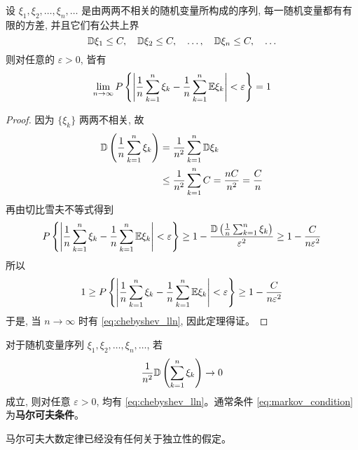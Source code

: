 \begin{proposition}[切比雪夫大数定律]\label{prop:chebyshev_lln}
    设 $\xi_1, \xi_2, \ldots, \xi_n, \ldots$ 是由两两不相关的随机变量所构成的序列, 每一随机变量都有有限的方差, 并且它们有公共上界
\[
\mathbb{D}\xi_1 \le C, \quad \mathbb{D}\xi_2 \le C, \quad \ldots, \quad \mathbb{D}\xi_n \le C, \quad \ldots
\]
则对任意的 $\varepsilon>0$, 皆有
\begin{equation} \label{eq:chebyshev_lln}
\lim_{n\to\infty} P\left\{ \left|\frac{1}{n}\sum_{k=1}^n \xi_k - \frac{1}{n}\sum_{k=1}^n \mathbb{E}\xi_k \right| < \varepsilon \right\} = 1
\end{equation}
\end{proposition}
\begin{proof}
    因为 $\{ \xi_k \}$ 两两不相关, 故
\begin{align*}
\mathbb{D}\left(\frac{1}{n}\sum_{k=1}^n \xi_k\right) &= \frac{1}{n^2}\sum_{k=1}^n \mathbb{D}\xi_k \\
&\le \frac{1}{n^2}\sum_{k=1}^n C = \frac{nC}{n^2} = \frac{C}{n}
\end{align*}
再由切比雪夫不等式得到
\[
P\left\{ \left|\frac{1}{n}\sum_{k=1}^n \xi_k - \frac{1}{n}\sum_{k=1}^n \mathbb{E}\xi_k \right| < \varepsilon \right\} \ge 1 - \frac{\mathbb{D}\left(\frac{1}{n}\sum_{k=1}^n \xi_k\right)}{\varepsilon^2} \ge 1 - \frac{C}{n\varepsilon^2}
\]
所以
\[
1 \ge P\left\{ \left|\frac{1}{n}\sum_{k=1}^n \xi_k - \frac{1}{n}\sum_{k=1}^n \mathbb{E}\xi_k \right| < \varepsilon \right\} \ge 1 - \frac{C}{n\varepsilon^2}
\]
于是, 当 $n\to\infty$ 时有 \eqref{eq:chebyshev_lln}, 因此定理得证。
\end{proof}

\begin{proposition}[马尔可夫大数定律]\label{prop:markov_lln}
    对于随机变量序列 $\xi_1, \xi_2, \ldots, \xi_n, \ldots$, 若 
    \begin{equation} \label{eq:markov_condition}
\frac{1}{n^2}\mathbb{D}\left(\sum_{k=1}^n \xi_k\right) \to 0
\end{equation}
成立, 则对任意 $\varepsilon>0$, 均有 \eqref{eq:chebyshev_lln}。通常条件 \eqref{eq:markov_condition} 为\textbf{马尔可夫条件}。
\end{proposition}
\begin{remark}
    马尔可夫大数定律已经没有任何关于独立性的假定。
\end{remark}


